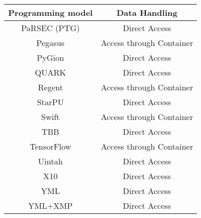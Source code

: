 \begin{tabular}{cc}
\hline
Programming model & Data Handling \\
\hline
PaRSEC (PTG) & Direct Access\\
Pegasus & Access through Container\\
PyGion & Direct Access\\
QUARK & Direct Access\\
Regent & Access through Container\\
StarPU & Direct Access\\
Swift & Access through Container\\
TBB & Direct Access\\
TensorFlow & Access through Container\\
Uintah & Direct Access\\
X10 & Direct Access\\
YML & Direct Access\\
YML+XMP & Direct Access\\
\hline
\end{tabular}
